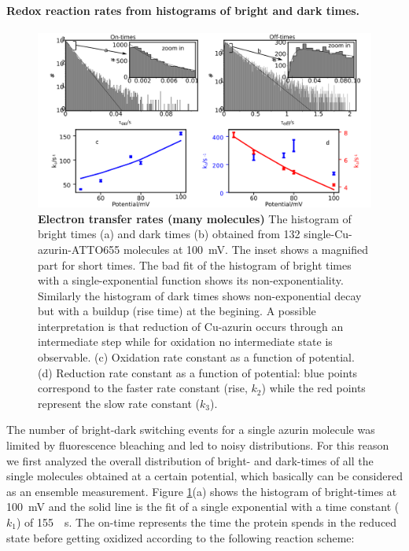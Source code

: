 \paragraph*{Redox reaction rates from histograms of bright and dark times.}
\begin{figure}
	\centering
	\includegraphics[width=\textwidth]{many_sm_hist}
	\caption{\textbf{Electron transfer rates (many molecules)} The histogram of bright times (a) and dark times (b) obtained from 132 single-Cu-azurin-ATTO655 molecules at \SI{100}{\mV}. The inset shows a magnified part for short times.
	The bad fit of the histogram of bright times with a single-exponential function shows its  non-exponentiality.
	Similarly the histogram of dark times shows non-exponential decay but with a buildup (rise time) at the begining.
	A possible interpretation is that reduction of Cu-azurin occurs through an intermediate step while for oxidation no intermediate state is observable.
	(c) Oxidation rate constant as a function of potential. 
	(d) Reduction rate constant as a function of potential: blue points correspond to the faster rate constant (rise, $k_2$) while the red points represent the slow rate constant ($k_3$).}
	\label{fig:many_sm_hist}
\end{figure}
The number of bright-dark switching events for a single azurin molecule was limited by fluorescence bleaching and led to noisy distributions.
For this reason we first analyzed the overall distribution of bright- and dark-times of all the single molecules obtained at a certain potential, which basically can be considered as an ensemble measurement.
Figure \ref{fig:many_sm_hist}(a) shows the histogram of bright-times at \SI{100}{\mV} and the solid line is the fit of a single exponential with a time constant ($k_{1}$) of \SI{155}{\per\s}.
The on-time represents the time the protein spends in the reduced state before getting oxidized according to the following reaction scheme:
